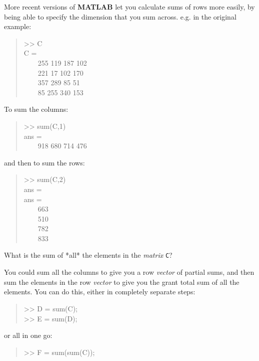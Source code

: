 \documentclass{tufte-book} %
\newenvironment{docspec}{\begin{quotation}\ttfamily\parskip0pt\parindent0pt\ignorespaces}{\end{quotation}}
\begin{document}
More recent versions of \textbf{MATLAB} let you calculate sums of rows more easily, by being able to specify the dimension that you sum across. e.g. in the original example:
\begin{docspec}
>> C\\
C =\\
\ \ \ \ 255   119   187   102\\
\ \ \ \ 221    17   102   170\\
\ \ \ \ 357   289    85    51\\
\ \ \ \ 85   255   340   153\\
\vspace{2mm}
\end{docspec}
To sum the columns:
\begin{docspec}
>> sum(C,1)\\
ans =\\
\ \ \ \ 918   680   714   476\\
\end{docspec}
and then to sum the rows:
\begin{docspec}
>> sum(C,2)\\
ans =\\
ans = \\
\ \ \ \ 663\\
\ \ \ \ 510\\
\ \ \ \ 782\\
\ \ \ \ 833
\end{docspec}


 What is the sum of *all* the elements in the \textit{matrix} \texttt{C}?

You could sum all the columns to give you a row \textit{vector} of partial sums, and then sum the elements in the row \textit{vector} to give you the grant total sum of all the elements. You can do this, either in completely separate steps:
\begin{docspec}
>> D = sum(C);\\
>> E = sum(D);
\end{docspec}
or all in one go:
\begin{docspec}
>> F = sum(sum(C));
\end{docspec}
\end{document}
